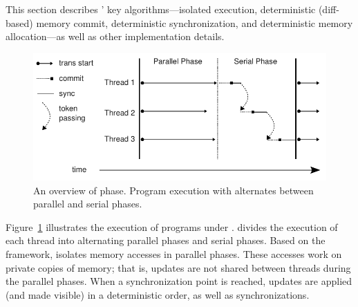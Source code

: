 \label{sec:dthreads-architecture}
This section describes \dthreads{}’ key algorithms---isolated execution, deterministic (diff-based) memory commit, deterministic synchronization, and deterministic memory allocation---as well as other implementation details.

\begin{figure}
{\centering 
\includegraphics[width=6in]{dthreads/figure/phase}
\caption{An overview of \dthreads{} phase. Program execution with \dthreads{} alternates between parallel and serial phases.\label{fig:phase}}
}
\end{figure}

Figure~\ref{fig:phase} illustrates the execution of programs under \dthreads{}. \dthreads{} divides the execution of each thread into alternating parallel phases and serial phases. 
Based on the \sheriff{} framework, \dthreads{} isolates memory accesses in parallel phases. These accesses work on private copies of memory; that is, updates are not shared between threads during the parallel phases. When a synchronization point is reached, updates are applied (and made visible) in a deterministic order, as well as synchronizations. 
  
